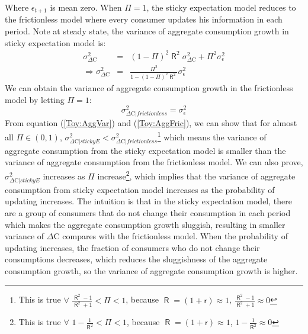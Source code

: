 \documentclass[12pt,letterpaper]{article}
\DeclareMathOperator{\R}{\mathsf{R}}
\begin{document}
Where $\epsilon_{t+1}$ is mean zero. When $\Pi=1$, the sticky expectation model reduces to the frictionless model where every consumer updates his information in each period. Note at steady state, the variance of aggregate consumption growth in sticky expectation model is:
\begin{eqnarray} \label{Toy:AggVar}
\sigma^{2}_{\Delta\mathrm{C}} & = & (1-\Pi)^{2}\R^{2} \sigma^{2}_{\Delta\mathrm{C}}+\Pi^2\sigma^{2}_{\epsilon}\\
\Rightarrow\sigma^{2}_{\Delta\mathrm{C}} & = & \frac{\Pi^2}{1-(1-\Pi)^{2}\R^{2}}\sigma^{2}_{\epsilon} \nonumber
\end{eqnarray}
We can obtain the variance of aggregate consumption growth in the frictionless model by letting $\Pi=1$:
\begin{equation} \label{Toy:AggFric}
\sigma^{2}_{\Delta\mathrm{C}|frictionless}=\sigma^{2}_{\epsilon}
\end{equation}
From equation (\ref{Toy:AggVar}) and (\ref{Toy:AggFric}), we can show that for almost all $\Pi\in(0,1)$, $\sigma^{2}_{\Delta\mathrm{C}|stickyE}<\sigma^{2}_{\Delta\mathrm{C}|frictionless}$\footnote{This is true $\forall$ $\frac{\R^2-1}{\R^2+1}<\Pi<1$, because $\R=(1+\mathsf{r})\approx1$, $\frac{\R^2-1}{\R^2+1}\approx0$} which means the variance of aggregate consumption from the sticky expectation model is smaller than the variance of aggregate consumption from the frictionless model. We can also prove, $\sigma^{2}_{\Delta\mathrm{C}|stickyE}$ increases as $\Pi$ increase\footnote{This is true $\forall$ $1-\frac{1}{\R^2}<\Pi<1$, because $\R=(1+\mathsf{r})\approx1$, $1-\frac{1}{\R^2}\approx0$}, which implies that the variance of aggregate consumption from sticky expectation model increases as the probability of updating increases. The intuition is that in the sticky expectation model, there are a group of consumers that do not change their consumption in each period which makes the aggregate consumption growth sluggish, resulting in smaller variance of $\Delta\mathrm{C}$ compares with the frictionless model. When the probability of updating increases, the fraction of consumers who do not change their consumptions decreases, which reduces the sluggishness of the aggregate consumption growth, so the variance of aggregate consumption growth is higher.
\end{document}
